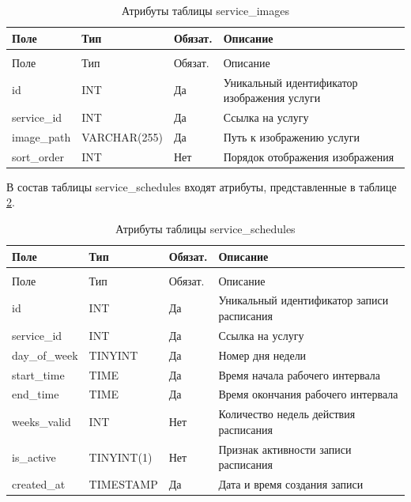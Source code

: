 \begin{longtable}{|>{\raggedright\arraybackslash}p{3.8cm}|>{\raggedright\arraybackslash}p{3.8cm}|>{\centering\arraybackslash}p{2.0cm}|>{\raggedright\arraybackslash}p{5.4cm}|}
	\caption{Атрибуты таблицы service\_images}\label{serviceimages:table} \\ \hline
	\centering Поле & \centering Тип & \centering Обязат. & \centering\arraybackslash Описание \\ \hline
	\endfirsthead
	\multicolumn{4}{l}{Продолжение таблицы \ref{serviceimages:table}} \\ \hline
	\centering Поле & \centering Тип & \centering Обязат. & \centering\arraybackslash Описание \\ \hline
	\endhead
	id & INT & Да & Уникальный идентификатор изображения услуги \\ \hline
	service\_id & INT & Да & Ссылка на услугу \\ \hline
	image\_path & VARCHAR(255) & Да & Путь к изображению услуги \\ \hline
	sort\_order & INT & Нет & Порядок отображения изображения \\ \hline
\end{longtable}

В состав таблицы service\_schedules входят атрибуты, представленные в таблице \ref{schedules:table}.

\begin{longtable}{|>{\raggedright\arraybackslash}p{3.8cm}|>{\raggedright\arraybackslash}p{3.8cm}|>{\centering\arraybackslash}p{2.0cm}|>{\raggedright\arraybackslash}p{5.4cm}|}
	\caption{Атрибуты таблицы service\_schedules}\label{schedules:table} \\ \hline
	\centering Поле & \centering Тип & \centering Обязат. & \centering\arraybackslash Описание \\ \hline
	\endfirsthead
	\multicolumn{4}{l}{Продолжение таблицы \ref{schedules:table}} \\ \hline
	\centering Поле & \centering Тип & \centering Обязат. & \centering\arraybackslash Описание \\ \hline
	\endhead
	id & INT & Да & Уникальный идентификатор записи расписания \\ \hline
	service\_id & INT & Да & Ссылка на услугу \\ \hline
	day\_of\_week & TINYINT & Да & Номер дня недели \\ \hline
	start\_time & TIME & Да & Время начала рабочего интервала \\ \hline
	end\_time & TIME & Да & Время окончания рабочего интервала \\ \hline
	weeks\_valid & INT & Нет & Количество недель действия расписания \\ \hline
	is\_active & TINYINT(1) & Нет & Признак активности записи расписания \\ \hline
	created\_at & TIMESTAMP & Да & Дата и время создания записи \\ \hline
\end{longtable}

